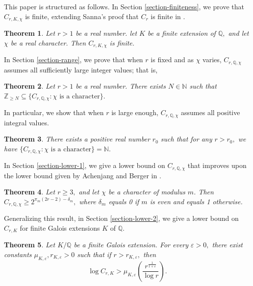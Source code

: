 \documentclass[12pt]{amsart}
\newtheorem{theorem}{Theorem}[section]
\theoremstyle{definition}
\numberwithin{equation}{section}
\newcommand{\Q}{\mathbb{Q}}
\newcommand{\Z}{\mathbb{Z}}
\newcommand{\N}{\mathbb{N}}
\begin{document}
This paper is structured as follows. 
In Section \ref{section-finiteness}, we prove that $C_{r,K,\chi}$ is finite, extending Sanna's proof that $C_{r}$ is finite in \cite[Theorem 1.1]{S17}.

\begin{theorem} \label{finiteness}
    Let $r > 1$ be a real number. let $K$ be a finite extension of $\Q,$ and let $\chi$ be a real character. Then $C_{r,K,\chi}$ is finite. 
\end{theorem} 

In Section \ref{section-range}, we prove that when $r$ is fixed and as $\chi$ varies, $C_{r,\Q,\chi}$ assumes all sufficiently large integer values; that is, 

\begin{theorem} \label{rangeC1}
    Let $r > 1$ be a real number. There exists $N \in \N$ such that $ \Z_{\geq N} \subseteq \{C_{r,\Q,\chi} : \chi \text{ is a character}\}.$
\end{theorem}

In particular, we show that when $r$ is large enough, $C_{r,\Q,\chi}$ assumes all positive integral values. 

\begin{theorem} \label{rangeC2}
    There exists a positive real number $r_0$ such that for any $r > r_0,$ we have $\{C_{r,\Q,\chi} : \chi \text{ is a character}\} = \N.$
\end{theorem}

In Section \ref{section-lower-1}, we give a lower bound on $C_{r,\Q,\chi}$ that improves upon the lower bound given by Achenjang and Berger in \cite[Theorem 5.2]{AB19}. 

\begin{theorem} \label{lowerbound1}
    Let $r \geq 3,$ and let $\chi$ be a character of modulus $m$. Then $C_{r,\Q,\chi} \geq 2^{\pi_m(2r-2)-\delta_m},$ where $\delta_m$ equals 0 if $m$ is even and equals 1 otherwise. 
\end{theorem}

Generalizing this result, in Section \ref{section-lower-2}, we give a lower bound on $C_{r,K}$ for finite Galois extensions $K$ of $\Q$.

\begin{theorem} \label{lowerbound2}
    Let $K/\Q$ be a finite Galois extension. For every $\varepsilon > 0,$ there exist constants $\mu_{K,\varepsilon}, r_{K,\varepsilon} > 0$ such that if $r > r_{K, \varepsilon},$ then $$\log C_{r,K} > \mu_{K, \varepsilon}\left( \frac{r^\frac{1}{1+\varepsilon}}{\log r} \right).$$
\end{theorem}
\end{document}
